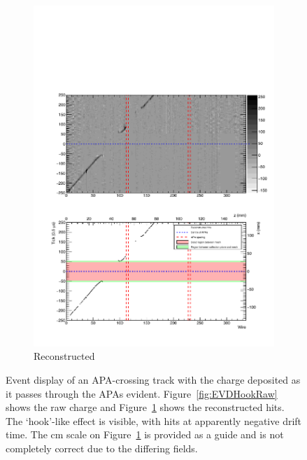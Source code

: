 \begin{figure}
\begin{subfigure}[t]{0.9\linewidth}
    \includegraphics[width=\textwidth]{evd_hook_reconstructed.pdf}
    \caption{Reconstructed}
    \label{fig:EVDHookReconstructed}
  \end{subfigure}
  \caption[Event display of an APA-crossing track with the charge deposited as it passes through the APAs evident.]{Event display of an APA-crossing track with the charge deposited as it passes through the APAs evident.  Figure~\ref{fig:EVDHookRaw} shows the raw charge and Figure~\ref{fig:EVDHookReconstructed} shows the reconstructed hits.  The `hook'-like effect is visible, with hits at apparently negative drift time.  The cm scale on Figure~\ref{fig:EVDHookReconstructed} is provided as a guide and is not completely correct due to the differing fields.}
  \label{fig:EVDHook}
\end{figure}

